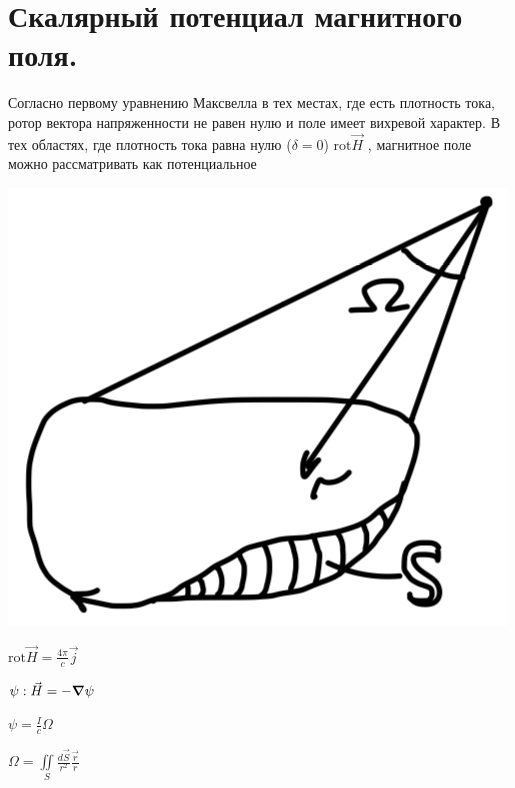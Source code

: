 \section{Скалярный потенциал магнитного поля.}
 
Согласно первому уравнению Максвелла в тех местах, где есть плотность тока, ротор вектора напряженности не равен нулю и поле имеет вихревой характер. В тех областях, где плотность тока равна нулю ($\delta =0$) $\mathrm{rot}\vec{H}$  , магнитное поле можно рассматривать как потенциальное



\noindent
\begin{minipage}[c]{0.3\textwidth} %
    \includegraphics[width=\textwidth]{im/64.png}{} %
\end{minipage}%
\hfill
\begin{minipage}[c]{0.55\textwidth} %
    \( \mathrm{rot}\vec{H}=\frac{4\pi}{c}\vec{j}   \) 
    
    \( \psi: \vec{H}=-\grad \psi \)
    
    \( \psi = \frac{I}{c}\Omega  \) 

    \( \Omega =\underset{S}{\iint}\frac{d\vec{S}}{r^2} \frac{\vec{r}}{r}   \) 
\end{minipage}
\[\text{ }\]
\noindent
